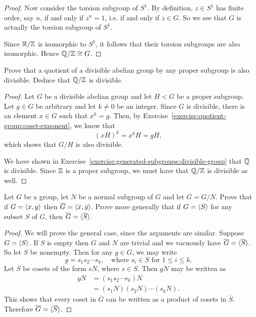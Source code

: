 \begin{enumerate}
\begin{proof}
    Now consider the torsion subgroup of $S^1$. By definition, $z\in S^1$
    has finite order, say $n$, if and only if $z^n = 1$, i.e. if and
    only if $z\in G$. So we see that $G$ is actually the torsion
    subgroup of $S^1$.

    Since $\mathbb{R}/\mathbb{Z}$ is isomorphic to $S^1$, it follows that their
    torsion subgroups are also isomorphic. Hence $\mathbb{Q}/\mathbb{Z}\cong G$.
  \end{proof}
\end{enumerate}

 Prove that a quotient of a divisible abelian group by
any proper subgroup is also divisible. Deduce that $\mathbb{Q}/\mathbb{Z}$ is
divisible.
\begin{proof}
  Let $G$ be a divisible abelian group and let $H<G$ be a proper
  subgroup. Let $g\in G$ be arbitrary and let $k\neq0$ be an
  integer. Since $G$ is divisible, there is an element $x\in G$ such
  that $x^k = g$. Then, by
  Exercise~\ref{exercise:quotient-group:coset-exponent}, we know that
  \begin{equation*}
    (xH)^k = x^kH = gH,
  \end{equation*}
  which shows that $G/H$ is also divisible.

  We have shown in
  Exercise~\ref{exercise:generated-subgroups:divisible-group} that
  $\mathbb{Q}$ is divisible. Since $\mathbb{Z}$ is a proper subgroup, we must have
  that $\mathbb{Q}/\mathbb{Z}$ is divisible as well.
\end{proof}

\label{exercise:quotient-group:generators}
Let $G$ be a group, let $N$ be a normal subgroup of $G$ and let
$\overline{G} = G/N$. Prove that if $G = \langle{x,y}\rangle$ then
$\overline{G} = \langle{\bar x,\bar y}\rangle$. Prove more generally that if
$G = \langle{S}\rangle$ for any subset $S$ of $G$, then
$\overline{G} = \langle{\overline{S}}\rangle$.
\begin{proof}
  We will prove the general case, since the arguments are
  similar. Suppose $G = \langle{S}\rangle$. If $S$ is empty then $G$ and $N$ are
  trivial and we vacuously have $\overline{G} =
  \langle{\overline{S}}\rangle$. So let $S$ be nonempty. Then for any $g\in G$,
  we may write
  \begin{equation*}
    g = s_1s_2\cdots s_k,
    \quad\text{where $s_i\in S$ for $1\leq i\leq k$}.
  \end{equation*}
  Let $\overline{S}$ be cosets of the form $sN$, where $s\in S$. Then
  $gN$ may be written as
  \begin{align*}
    gN &= (s_1s_2\cdots s_k)N \\
       &= (s_1N)(s_2N)\cdots(s_kN).
  \end{align*}
  This shows that every coset in $\overline{G}$ can be written as a
  product of cosets in $\overline{S}$. Therefore
  $\overline{G} = \langle{\overline{S}}\rangle$.
\end{proof}

